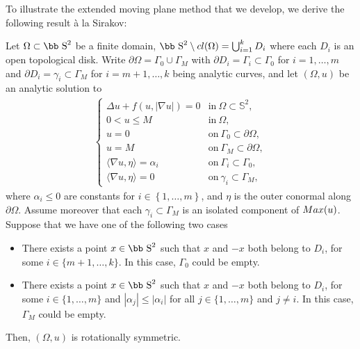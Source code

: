 \documentclass[11pt]{article}
\def\s{\hbox{\bb S}}
\newcommand{\Max}{\textup{Max}}
\newcommand{\set}[1]{\left\{#1\right\}}
\numberwithin{equation} {section}
\begin{document}
To illustrate the extended moving plane method that we develop, we derive the following result \`a la Sirakov:

\begin{lemma}\label{LemSirakov}
Let $\Omega \subset \s^2$ be a finite domain, $\s ^2 \setminus {\rm cl}(\Omega) = \bigcup _{i=1}^k D_i $ where each $D_i$ is an open topological disk. Write $\partial \Omega = \Gamma _0 \cup \Gamma _M$ with $\partial D_i=\Gamma_i \subset \Gamma _0$ for $i=1,\ldots,m$ and $\partial D_i=\gamma_i \subset \Gamma _M$ for $i=m+1,\ldots,k$ being analytic curves, and let $(\Omega ,u)$ be an analytic solution to
\begin{eqnarray*} 
    \left\{
    \begin{array}{llll}
        \Delta{u} + f(u, |\nabla u|) = 0  & \mathrm{in}~\Omega \subset \mathbb{S}^2, \\
        0 < u \leq M  & \mathrm{in}~\Omega, \\
        u = 0  & \mathrm{on}~\Gamma _0 \subset \partial \Omega ,\\
        u = M  & \mathrm{on}~\Gamma _M \subset \partial \Omega ,\\
        \langle \nabla u, \eta \rangle = \alpha_i  & \mathrm{on}~\Gamma_{i} \subset \Gamma _0,\\
        \langle \nabla u, \eta \rangle = 0  & \mathrm{on}~\gamma_i \subset \Gamma _M,
    \end{array}
    \right.
\end{eqnarray*}
where $\alpha_i \leq 0$ are constants for $i \in \set{1, \dots, m}$, and $\eta $ is the outer conormal along $\partial \Omega$. Assume moreover that each $\gamma _i \subset \Gamma _M$ is an isolated component of $\Max (u)$. Suppose that we have one of the following two cases
\begin{itemize}
	\item[(i)] There exists a point $x \in \s^2$ such that $x$ and $-x$ both belong to $D_i$, for some $i \in \{m+1,\ldots,k\}$. In this case, $\Gamma_0$ could be empty.
	\item[(ii)] There exists a point $x \in \s^2$ such that $x$ and $-x$ both belong to $D_i$, for some $i \in \{1,\ldots,m\}$ and $|\alpha _j | \leq |\alpha _i|$ for all $j \in \{1, \ldots , m \}$ and $j \neq i$. In this case, $\Gamma_M$ could be empty.
\end{itemize}
Then, $(\Omega ,u)$ is rotationally symmetric.
\end{lemma}
\end{document}
